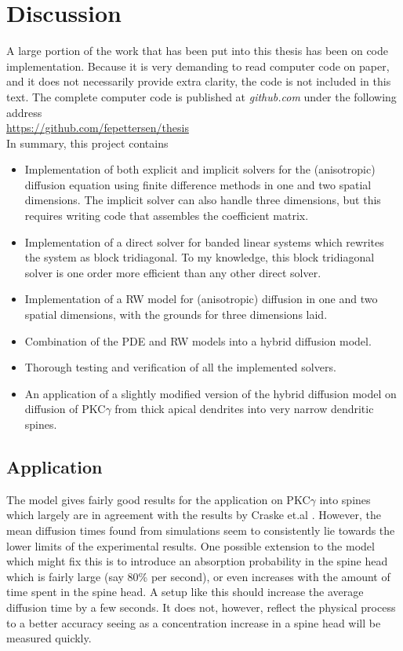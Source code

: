 \section{Discussion}

A large portion of the work that has been put into this thesis has been on code implementation. 
Because it is very demanding to read computer code on paper, and it does not necessarily provide extra clarity, the code is not included in this text. 
The complete computer code is published at \emph{github.com} under the following address \\

\noindent\url{https://github.com/fepettersen/thesis} \\

In summary, this project contains
\begin{itemize}
 \item Implementation of both explicit and implicit solvers for the (anisotropic) diffusion equation using finite difference methods in one and two spatial dimensions. The implicit solver can also handle three dimensions, but this requires writing code that assembles the coefficient matrix.
 \item Implementation of a direct solver for banded linear systems which rewrites the system as block tridiagonal. To my knowledge, this block tridiagonal solver is one order more efficient than any other direct solver.
 \item Implementation of a RW model for (anisotropic) diffusion in one and two spatial dimensions, with the grounds for three dimensions laid.
 \item Combination of the PDE and RW models into a hybrid diffusion model. 
 \item Thorough testing and verification of all the implemented solvers.
 \item An application of a slightly modified version of the hybrid diffusion model on diffusion of PKC$\gamma$ from thick apical dendrites into very narrow dendritic spines.
\end{itemize}

\subsection{Application}

The model gives fairly good results for the application on PKC$\gamma$ into spines which largely are in agreement with the results by Craske et.al \cite{craske2005spines}. 
However, the mean diffusion times found from simulations seem to consistently lie towards the lower limits of the experimental results. 
One possible extension to the model which might fix this is to introduce an absorption probability in the spine head which is fairly large (say 80\% per second), or even increases with the amount of time spent in the spine head. 
A setup like this should increase the average diffusion time by a few seconds. 
It does not, however, reflect the physical process to a better accuracy seeing as a concentration increase in a spine head will be measured quickly.

